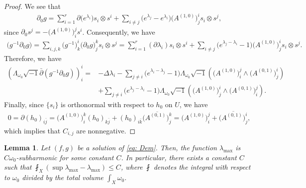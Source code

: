 \documentclass[a4, 12pt, 
]{amsart}
\numberwithin{equation}{section}
\theoremstyle{plain}
\newtheorem{lem}[equation]{Lemma}
\theoremstyle{definition}
\theoremstyle{remark}
\begin{document}
\begin{proof}
We see that
\begin{align*}
    \partial_0 g=\sum_{i=1}^r \partial \big(e^{\lambda_i}\big) s_i\otimes s^i + \sum_{i\neq j} \big(e^{\lambda_j}-e^{\lambda_i}\big)\big(A^{(1,0)}\big)^i_j s_i\otimes s^j,
\end{align*}
since $\partial_0 s^j=-\big(A^{(1,0)}\big)^j_i s^i$. Consequently, we have
\begin{align*}
    \big(g^{-1}\partial_0  g\big)=\sum_{i,j,k}\big(g^{-1}\big)^i_k\big(\partial_0g\big)^k_j s_i\otimes s^j=\sum_{i=1}^r (\partial\lambda_i) s_i\otimes s^i+\sum_{i\neq j}\big(e^{\lambda_j-\lambda_i}-1\big)\big(A^{(1,0)}\big)^i_j s_i\otimes s^j.
\end{align*}
Therefore, we have
\begin{equation*}
\begin{aligned}
    \left(\Lambda_{\omega_0}\sqrt{-1}\bar{\partial}(g^{-1}\partial_0g)\right)^i_i
    =&- \Delta\lambda_i
    -\sum_{j\neq i}\big(e^{\lambda_i-\lambda_j}-1\big)\Lambda_{\omega_0}\sqrt{-1}\left(\big(A^{(1,0)}\big)^j_i \wedge\big(A^{(0,1)}\big)^i_j\right)\\
    &+\sum_{j\neq i}\big(e^{\lambda_j-\lambda_i}-1\big)\Lambda_{\omega_0}\sqrt{-1}\left(\big(A^{(1,0)}\big)^i_j \wedge\big(A^{(0,1)}\big)^j_i\right).
\end{aligned}
\end{equation*}
Finally, since $\{s_i\}$ is orthonormal with respect to $h_0$ on $U$, we have
\begin{align*}
    0=\partial (h_0)_{i\bar{j}}=\big(A^{(1,0)}\big)^k_i (h_0)_{k\bar{j}}+(h_0)_{i\bar{k}}\overline{\big(A^{(0,1)}\big)^k_j}=\big(A^{(1,0)}\big)^j_i+\overline{\big(A^{(0,1)}\big)^i_j},
\end{align*}
which implies that $C_{i,j}$ are nonnegative.
\end{proof}

\begin{lem}\label{lem: Deltalambda}
    Let $(f,g)$ be a solution of \eqref{eq: Dem}. Then, the function $\lambda_{\mathrm{max}}$ is $C\omega_0$-subharmonic for some constant $C$. In particular, there exists a constant $C$ such that $\fint_X (\sup \lambda_{\mathrm{max}}-\lambda_{\mathrm{max}})\le C$, where $\fint$ denotes the integral with respect to $\omega_0$ divided by the total volume $\int_X\omega_0$.
\end{lem}    
\end{document}
